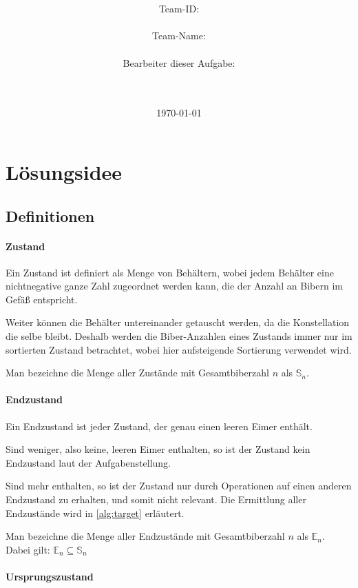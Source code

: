 \documentclass[a4paper,10pt,ngerman]{scrartcl}
\title{\textbf{\Huge\Aufgabe}}
\author{\LARGE Team-ID: \LARGE \TeamID \\\\
        \LARGE Team-Name: \LARGE \TeamName \\\\
        \LARGE Bearbeiter dieser Aufgabe: \\ 
        \LARGE \Namen\\\\}
\date{\LARGE\today}
\begin{document}
\maketitle
\tableofcontents

\vspace{0.5cm}

\section{Lösungsidee}

\subsection{Definitionen}

\paragraph{Zustand} \label{def:state}

Ein Zustand ist definiert als Menge von Behältern, wobei jedem Behälter eine nichtnegative ganze Zahl zugeordnet werden kann, die der Anzahl an Bibern im Gefäß entspricht.

Weiter können die Behälter untereinander getauscht werden, da die Konstellation die selbe bleibt. Deshalb werden die Biber-Anzahlen eines Zustands immer nur im sortierten Zustand betrachtet, wobei hier aufsteigende Sortierung verwendet wird.

Man bezeichne die Menge aller Zustände mit Gesamtbiberzahl \(n\) als \(\mathbb{S}_n\).

\paragraph{Endzustand} \label{def:target}

Ein Endzustand ist jeder Zustand, der genau einen leeren Eimer enthält.

Sind weniger, also keine, leeren Eimer enthalten, so ist der Zustand kein Endzustand laut der Aufgabenstellung.

Sind mehr enthalten, so ist der Zustand nur durch Operationen auf einen anderen Endzustand zu erhalten, und somit nicht relevant. Die Ermittlung aller Endzustände wird in \cref{alg:target} erläutert.

Man bezeichne die Menge aller Endzustände mit Gesamtbiberzahl \(n\) als \(\mathbb{E}_n\).
Dabei gilt: \(\mathbb{E}_n\subseteq\mathbb{S}_n\)

\paragraph{Ursprungszustand} \label{def:origin}
\end{document}
